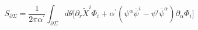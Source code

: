\begin{equation}
S_{\partial\Sigma}=\frac{1}{2\pi\alpha^\prime}\int_{\partial\Sigma}
d\theta\bigl\lbrack\partial_r {\tilde X}^i\Phi_i+
\alpha^\prime(\psi^\alpha{\bar\psi}^i-\psi^i{\bar\psi}^\alpha)
\partial_\alpha\Phi_i\bigr\rbrack
\end{equation}

